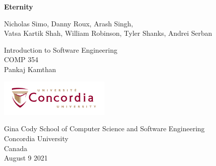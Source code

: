 \begin{titlepage}
   \begin{center}
       \vspace*{1cm}

       \Huge
       \textbf{Eternity}

        \vspace{0.5cm}
        \Large
        Nicholas Simo, Danny Roux, Arash Singh,
        \\Vatsa Kartik Shah, William Robinson, Tyler Shanks, Andrei Serban

       \vspace{6cm}
        Introduction to Software Engineering
        \\COMP 354
        \\Pankaj Kamthan


       \vspace{1.5cm}

        \Large

       \vfill

       \vspace{0.8cm}

       \includegraphics[width=0.4\textwidth]{images/concologo.png}

       Gina Cody School of Computer Science and Software Engineering\\
       Concordia University\\
       Canada\\
       August 9 2021

   \end{center}
\end{titlepage}
